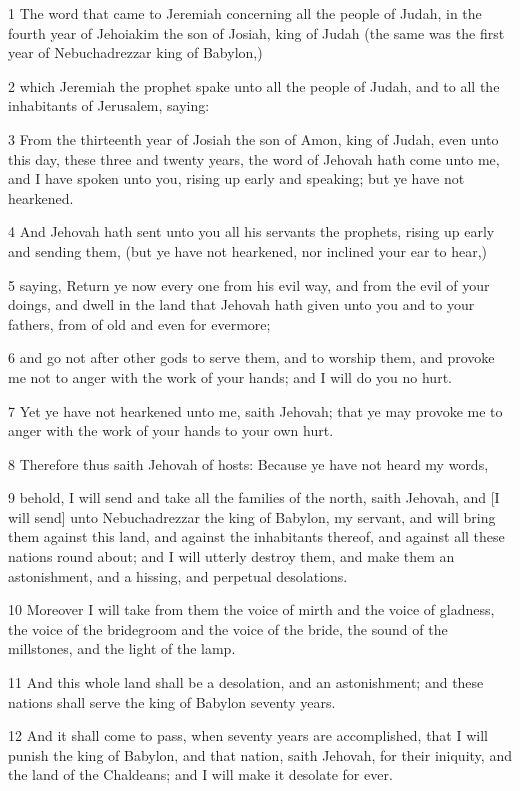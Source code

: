 \par 1 The word that came to Jeremiah concerning all the people of Judah, in the fourth year of Jehoiakim the son of Josiah, king of Judah (the same was the first year of Nebuchadrezzar king of Babylon,)
\par 2 which Jeremiah the prophet spake unto all the people of Judah, and to all the inhabitants of Jerusalem, saying:
\par 3 From the thirteenth year of Josiah the son of Amon, king of Judah, even unto this day, these three and twenty years, the word of Jehovah hath come unto me, and I have spoken unto you, rising up early and speaking; but ye have not hearkened.
\par 4 And Jehovah hath sent unto you all his servants the prophets, rising up early and sending them, (but ye have not hearkened, nor inclined your ear to hear,)
\par 5 saying, Return ye now every one from his evil way, and from the evil of your doings, and dwell in the land that Jehovah hath given unto you and to your fathers, from of old and even for evermore;
\par 6 and go not after other gods to serve them, and to worship them, and provoke me not to anger with the work of your hands; and I will do you no hurt.
\par 7 Yet ye have not hearkened unto me, saith Jehovah; that ye may provoke me to anger with the work of your hands to your own hurt.
\par 8 Therefore thus saith Jehovah of hosts: Because ye have not heard my words,
\par 9 behold, I will send and take all the families of the north, saith Jehovah, and [I will send] unto Nebuchadrezzar the king of Babylon, my servant, and will bring them against this land, and against the inhabitants thereof, and against all these nations round about; and I will utterly destroy them, and make them an astonishment, and a hissing, and perpetual desolations.
\par 10 Moreover I will take from them the voice of mirth and the voice of gladness, the voice of the bridegroom and the voice of the bride, the sound of the millstones, and the light of the lamp.
\par 11 And this whole land shall be a desolation, and an astonishment; and these nations shall serve the king of Babylon seventy years.
\par 12 And it shall come to pass, when seventy years are accomplished, that I will punish the king of Babylon, and that nation, saith Jehovah, for their iniquity, and the land of the Chaldeans; and I will make it desolate for ever.

